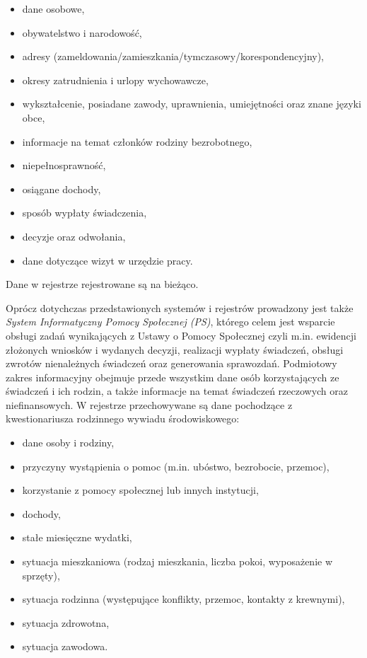 \begin{itemize}
\item dane osobowe,
\item obywatelstwo i narodowość,
\item adresy (zameldowania/zamieszkania/tymczasowy/korespondencyjny),
\item okresy zatrudnienia i urlopy wychowawcze,
\item wykształcenie, posiadane zawody, uprawnienia, umiejętności oraz znane języki obce, 
\item informacje na temat członków rodziny bezrobotnego,
\item niepełnosprawność,
\item osiągane dochody,
\item sposób wypłaty świadczenia,
\item decyzje oraz odwołania,
\item dane dotyczące wizyt w urzędzie pracy.
\end{itemize}

Dane w rejestrze rejestrowane są na bieżąco. 

Oprócz dotychczas przedstawionych systemów i rejestrów prowadzony jest także \textit{System Informatyczny Pomocy Społecznej (PS)}, którego celem jest wsparcie obsługi zadań wynikających z Ustawy o Pomocy Społecznej czyli m.in. ewidencji złożonych wniosków i wydanych decyzji, realizacji wypłaty świadczeń, obsługi zwrotów nienależnych świadczeń oraz generowania sprawozdań. Podmiotowy zakres informacyjny obejmuje przede wszystkim dane osób korzystających ze świadczeń i ich rodzin, a także informacje na temat świadczeń rzeczowych oraz niefinansowych. W rejestrze przechowywane są dane pochodzące z kwestionariusza rodzinnego wywiadu środowiskowego:

\begin{itemize}
\item dane osoby i rodziny,
\item przyczyny wystąpienia o pomoc (m.in. ubóstwo, bezrobocie, przemoc),
\item korzystanie z pomocy społecznej lub innych instytucji,
\item dochody,
\item stałe miesięczne wydatki,
\item sytuacja mieszkaniowa (rodzaj mieszkania, liczba pokoi, wyposażenie w sprzęty),
\item sytuacja rodzinna (występujące konflikty, przemoc, kontakty z krewnymi),
\item sytuacja zdrowotna,
\item sytuacja zawodowa.
\end{itemize}

